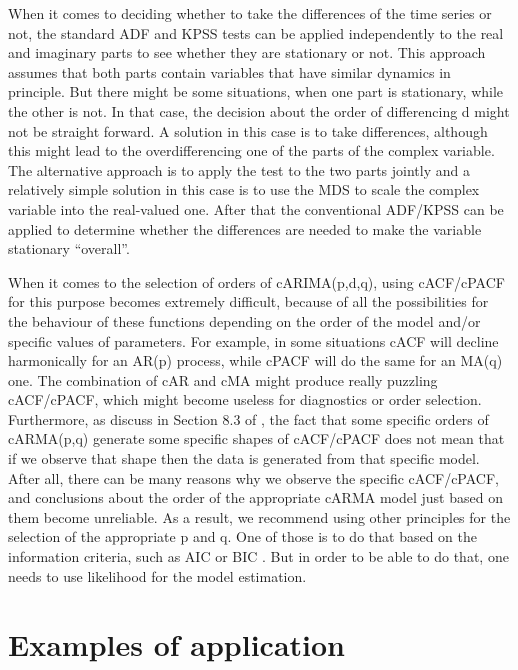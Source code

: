 \documentclass[
]{book}
\begin{document}
When it comes to deciding whether to take the differences of the time series or not, the standard ADF \citep{Dickey1979} and KPSS \citep{Kwiatkowski1992} tests can be applied independently to the real and imaginary parts to see whether they are stationary or not. This approach assumes that both parts contain variables that have similar dynamics in principle. But there might be some situations, when one part is stationary, while the other is not. In that case, the decision about the order of differencing d might not be straight forward. A solution in this case is to take differences, although this might lead to the overdifferencing one of the parts of the complex variable. The alternative approach is to apply the test to the two parts jointly and a relatively simple solution in this case is to use the MDS to scale the complex variable into the real-valued one. After that the conventional ADF/KPSS can be applied to determine whether the differences are needed to make the variable stationary ``overall''.

When it comes to the selection of orders of cARIMA(p,d,q), using cACF/cPACF for this purpose becomes extremely difficult, because of all the possibilities for the behaviour of these functions depending on the order of the model and/or specific values of parameters. For example, in some situations cACF will decline harmonically for an AR(p) process, while cPACF will do the same for an MA(q) one. The combination of cAR and cMA might produce really puzzling cACF/cPACF, which might become useless for diagnostics or order selection. Furthermore, as discuss in Section 8.3 of \citet{SvetunkovAdam}, the fact that some specific orders of cARMA(p,q) generate some specific shapes of cACF/cPACF does not mean that if we observe that shape then the data is generated from that specific model. After all, there can be many reasons why we observe the specific cACF/cPACF, and conclusions about the order of the appropriate cARMA model just based on them become unreliable. As a result, we recommend using other principles for the selection of the appropriate p and q. One of those is to do that based on the information criteria, such as AIC \citep{Akaike1974} or BIC \citep{Schwarz1978}. But in order to be able to do that, one needs to use likelihood for the model estimation.

\hypertarget{Examples}{%
\chapter{Examples of application}\label{Examples}}
\end{document}
